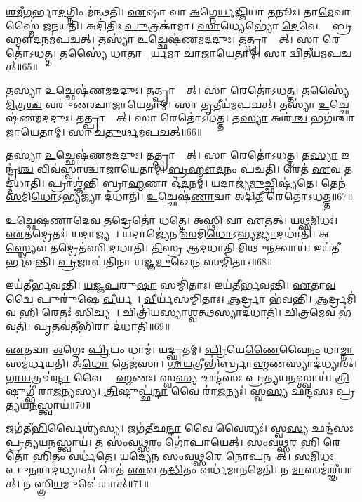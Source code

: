 \ul{𑌶}\ul{𑌮𑍀}\ul{𑌗}𑌰𑍍𑌭𑌾\ul{𑌦}𑌗𑍍𑌨𑌿𑌂 𑌮॑𑌨𑍍𑌥𑌤𑌿।
\ul{𑌏}𑌷𑌾 𑌵𑌾 \ul{𑌅}𑌗𑍍𑌨𑍇\ul{𑌰𑍍𑌯}𑌜𑍍𑌞𑌿𑌯𑌾॑ \ul{𑌤}𑌨𑍂𑌃।
𑌤𑌾\ul{𑌮𑍇}𑌵𑌾𑌸𑍍𑌮𑍈॑ 𑌜𑌨𑌯𑌤𑌿।
𑌅𑌦𑌿॑𑌤𑌿𑌃 \ul{𑌪𑍁}𑌤𑍍𑌰𑌕𑌾॑𑌮𑌾।
\ul{𑌸𑌾}𑌧𑍍𑌯𑍇𑌭𑍍𑌯𑍋॑ \ul{𑌦𑍇}𑌵𑍇𑌭𑍍𑌯𑍋᳚ 𑌬𑍍𑌰𑌹𑍍𑌮𑍗\ul{𑌦}𑌨𑌮॑𑌪𑌚𑌤𑍍।
𑌤𑌸𑍍𑌯𑌾॑ \ul{𑌉}𑌚𑍍𑌛𑍇𑌷॑𑌣𑌮𑌦𑌦𑍁𑌃।
𑌤𑌤𑍍𑌪𑍍𑌰𑌾𑌶𑍍𑌞𑌾᳚𑌤𑍍।
𑌸𑌾 𑌰𑍇𑌤𑍋॑\-𑌽𑌧𑌤𑍍𑌤।
𑌤𑌸𑍍𑌯𑍈॑ \ul{𑌧𑌾}𑌤𑌾 𑌚𑌾᳚\ul{𑌰𑍍𑌯}𑌮𑌾 𑌚𑌾॑𑌜𑌾𑌯𑍇𑌤𑌾𑌮𑍍।
𑌸𑌾 \ul{𑌦𑍍𑌵𑌿}𑌤𑍀𑌯॑𑌮𑌪𑌚𑌤𑍍॥65॥

𑌤𑌸𑍍𑌯𑌾॑ \ul{𑌉}𑌚𑍍𑌛𑍇𑌷॑𑌣𑌮𑌦𑌦𑍁𑌃।
𑌤𑌤𑍍𑌪𑍍𑌰𑌾𑌶𑍍𑌞𑌾᳚𑌤𑍍।
𑌸𑌾 𑌰𑍇𑌤𑍋॑\-𑌽𑌧𑌤𑍍𑌤।
𑌤𑌸𑍍𑌯𑍈॑ \ul{𑌮𑌿}𑌤𑍍𑌰\ul{𑌶𑍍𑌚} 𑌵𑌰𑍁॑𑌣𑌶𑍍𑌚𑌾𑌜𑌾𑌯𑍇𑌤𑌾𑌮𑍍।
𑌸𑌾 \ul{𑌤𑍃}𑌤𑍀𑌯॑𑌮𑌪𑌚𑌤𑍍।
𑌤𑌸𑍍𑌯𑌾॑ \ul{𑌉}𑌚𑍍𑌛𑍇𑌷॑𑌣𑌮𑌦𑌦𑍁𑌃।
𑌤𑌤𑍍𑌪𑍍𑌰𑌾𑌶𑍍𑌞𑌾᳚𑌤𑍍।
𑌸𑌾 𑌰𑍇𑌤𑍋॑\-𑌽𑌧𑌤𑍍𑌤।
𑌤\ul{𑌸𑍍𑌯𑌾} 𑌅𑌶॑\ul{𑌶𑍍𑌚} 𑌭𑌗॑𑌶𑍍𑌚𑌾𑌜𑌾𑌯𑍇𑌤𑌾𑌮𑍍।
𑌸𑌾 𑌚॑\ul{𑌤𑍁}𑌰𑍍𑌥𑌮॑𑌪𑌚𑌤𑍍॥66॥

𑌤𑌸𑍍𑌯𑌾॑ \ul{𑌉}𑌚𑍍𑌛𑍇𑌷॑𑌣𑌮𑌦𑌦𑍁𑌃।
𑌤𑌤𑍍𑌪𑍍𑌰𑌾𑌶𑍍𑌞𑌾᳚𑌤𑍍।
𑌸𑌾 𑌰𑍇𑌤𑍋॑\-𑌽𑌧𑌤𑍍𑌤।
𑌤\ul{𑌸𑍍𑌯𑌾} 𑌇𑌨𑍍𑌦𑍍𑌰॑\ul{𑌶𑍍𑌚} 𑌵𑌿𑌵॑𑌸𑍍𑌵𑌾𑌶𑍍𑌚𑌾𑌜𑌾𑌯𑍇𑌤𑌾𑌮𑍍।
\ul{𑌬𑍍𑌰}\ul{𑌹𑍍𑌮𑍗}\ul{𑌦}𑌨𑌂 𑌪॑𑌚𑌤𑌿।
𑌰𑍇𑌤॑ \ul{𑌏}𑌵 𑌤𑌦𑍍𑌦॑𑌧𑌾𑌤𑌿।
𑌪𑍍𑌰𑌾𑌶𑍍𑌞॑𑌨𑍍𑌤𑌿 𑌬𑍍𑌰𑌾\ul{𑌹𑍍𑌮}𑌣𑌾 𑌓॑\ul{𑌦}𑌨𑌮𑍍।
𑌯𑌦𑌾𑌜𑍍𑌯॑\ul{𑌮𑍁}𑌚𑍍𑌛𑌿𑌷𑍍𑌯॑𑌤𑍇।
𑌤𑍇𑌨॑ \ul{𑌸}𑌮𑌿\ul{𑌧𑍋}\-𑌽𑌭𑍍𑌯𑌜𑍍𑌯𑌾 𑌦॑𑌧𑌾𑌤𑌿।
\ul{𑌉}𑌚𑍍𑌛𑍇𑌷॑\ul{𑌣𑌾}𑌦𑍍𑌵𑌾 𑌅𑌦𑌿॑\ul{𑌤𑍀} 𑌰𑍇𑌤𑍋॑\-𑌽𑌧𑌤𑍍𑌤॥67॥

\ul{𑌉}𑌚𑍍𑌛𑍇𑌷॑𑌣𑌾\ul{𑌦𑍇}𑌵 𑌤𑌦𑍍𑌰𑍇𑌤𑍋॑ 𑌧𑌤𑍍𑌤𑍇।
𑌅\ul{𑌸𑍍𑌥𑌿} 𑌵𑌾 \ul{𑌏}𑌤𑌤𑍍।
𑌯\ul{𑌥𑍍𑌸}𑌮𑌿𑌧𑌃॑।
\ul{𑌏}𑌤𑌦𑍍𑌰𑍇𑌤𑌃॑।
𑌯𑌦𑌾𑌜𑍍𑌯𑌮𑍍᳚।
𑌯𑌦𑌾𑌜𑍍𑌯𑍇॑𑌨 \ul{𑌸}𑌮𑌿\ul{𑌧𑍋}\-𑌽𑌭𑍍𑌯\ul{𑌜𑍍𑌯𑌾}𑌦𑌧𑌾॑𑌤𑌿।
𑌅\ul{𑌸𑍍𑌥𑍍𑌯𑍇}𑌵 𑌤𑌦𑍍𑌰𑍇𑌤॑𑌸𑌿 𑌦𑌧𑌾𑌤𑌿।
\ul{𑌤𑌿}𑌸𑍍𑌰 𑌆𑌦॑𑌧𑌾𑌤𑌿 𑌮𑌿𑌥𑍁\ul{𑌨}𑌤𑍍𑌵𑌾𑌯॑।
𑌇𑌯॑𑌤𑍀𑌰𑍍𑌭𑌵𑌨𑍍𑌤𑌿।
\ul{𑌪𑍍𑌰}𑌜𑌾𑌪॑𑌤𑌿𑌨𑌾 𑌯𑌜𑍍𑌞\ul{𑌮𑍁}𑌖𑍇\ul{𑌨} 𑌸𑌮𑍍𑌮𑌿॑𑌤𑌾𑌃॥68॥

𑌇𑌯॑𑌤𑍀𑌰𑍍𑌭𑌵𑌨𑍍𑌤𑌿।
\ul{𑌯}\ul{𑌜𑍍𑌞}\ul{𑌪}𑌰𑍁\ul{𑌷𑌾} 𑌸𑌮𑍍𑌮𑌿॑𑌤𑌾𑌃।
𑌇𑌯॑𑌤𑍀𑌰𑍍𑌭𑌵𑌨𑍍𑌤𑌿।
\ul{𑌏}𑌤𑌾\ul{𑌵}𑌦𑍍𑌵𑍈 𑌪𑍁𑌰𑍁॑𑌷𑍇 \ul{𑌵𑍀}𑌰𑍍𑌯𑌮𑍍᳚।
\ul{𑌵𑍀}𑌰𑍍𑌯॑𑌸𑌮𑍍𑌮𑌿𑌤𑌾𑌃।
\ul{𑌆}𑌰𑍍𑌦𑍍𑌰𑌾 𑌭॑𑌵𑌨𑍍𑌤𑌿।
\ul{𑌆}𑌰𑍍𑌦𑍍𑌰𑌮𑌿॑\ul{𑌵} 𑌹𑌿 𑌰𑍇𑌤𑌃॑ \ul{𑌸𑌿}𑌚𑍍𑌯𑌤𑍇᳚।
𑌚𑌿𑌤𑍍𑌰𑌿॑𑌯𑌸𑍍𑌯𑌾\ul{𑌶𑍍𑌵}𑌤𑍍𑌥𑌸𑍍𑌯𑌾𑌦॑𑌧𑌾𑌤𑌿।
\ul{𑌚𑌿}𑌤𑍍𑌰\ul{𑌮𑍇}𑌵 𑌭॑𑌵𑌤𑌿।
\ul{𑌘𑍃}𑌤𑌵॑𑌤𑍀\ul{𑌭𑌿}𑌰𑌾 𑌦॑𑌧𑌾𑌤𑌿॥69॥

\ul{𑌏}𑌤𑌦𑍍𑌵𑌾 \ul{𑌅}𑌗𑍍𑌨𑍇𑌃 \ul{𑌪𑍍𑌰𑌿}𑌯𑌂 𑌧𑌾𑌮॑।
𑌯𑌦𑍍\mbox{}\ul{𑌘𑍃}𑌤𑌮𑍍।
\ul{𑌪𑍍𑌰𑌿}𑌯𑍇\ul{𑌣𑍈}𑌵𑍈\ul{𑌨𑌂} 𑌧𑌾\ul{𑌮𑍍𑌨𑌾} 𑌸𑌮॑𑌰𑍍𑌧𑌯𑌤𑌿।
𑌅\ul{𑌥𑍋} 𑌤𑍇𑌜॑𑌸𑌾।
\ul{𑌗𑌾}\ul{𑌯}𑌤𑍍𑌰𑍀𑌭𑌿॑𑌰𑍍𑌬𑍍𑌰𑌾\ul{𑌹𑍍𑌮}𑌣𑌸𑍍𑌯𑌾𑌦॑𑌧𑍍𑌯𑌾𑌤𑍍।
\ul{𑌗𑌾}\ul{𑌯}𑌤𑍍𑌰𑌛॑\ul{𑌨𑍍𑌦𑌾} 𑌵𑍈 𑌬𑍍𑌰𑌾᳚\ul{𑌹𑍍𑌮}𑌣𑌃।
𑌸𑍍𑌵\ul{𑌸𑍍𑌯} 𑌛𑌨𑍍𑌦॑𑌸𑌃 𑌪𑍍𑌰𑌤𑍍𑌯𑌯\ul{𑌨}𑌸𑍍𑌤𑍍𑌵𑌾𑌯॑।
\ul{𑌤𑍍𑌰𑌿}𑌷𑍍𑌟𑍁𑌗𑍍𑌭𑍀॑ 𑌰𑌾\ul{𑌜}𑌨𑍍𑌯॑𑌸𑍍𑌯।
\ul{𑌤𑍍𑌰𑌿}𑌷𑍍𑌟𑍁𑌪𑍍𑌛॑\ul{𑌨𑍍𑌦𑌾} 𑌵𑍈 𑌰𑌾॑\ul{𑌜}𑌨𑍍𑌯𑌃॑।
𑌸𑍍𑌵\ul{𑌸𑍍𑌯} 𑌛𑌨𑍍𑌦॑𑌸𑌃 𑌪𑍍𑌰𑌤𑍍𑌯𑌯\ul{𑌨}𑌸𑍍𑌤𑍍𑌵𑌾𑌯॑॥70॥

𑌜𑌗॑𑌤𑍀\ul{𑌭𑌿}𑌰𑍍𑌵𑍈𑌶𑍍𑌯॑𑌸𑍍𑌯।
𑌜𑌗॑𑌤𑍀𑌛\ul{𑌨𑍍𑌦𑌾} 𑌵𑍈 𑌵𑍈𑌶𑍍𑌯𑌃॑।
𑌸𑍍𑌵\ul{𑌸𑍍𑌯} 𑌛𑌨𑍍𑌦॑𑌸𑌃 𑌪𑍍𑌰𑌤𑍍𑌯𑌯\ul{𑌨}𑌸𑍍𑌤𑍍𑌵𑌾𑌯॑।
𑌤 𑌸𑌂॑𑌵\ul{𑌥𑍍𑌸}𑌰𑌂 𑌗𑍋॑𑌪𑌾𑌯𑍇𑌤𑍍।
\ul{𑌸𑌂}\ul{𑌵}\ul{𑌥𑍍𑌸}𑌰 𑌹𑌿 𑌰𑍇𑌤𑍋॑ \ul{𑌹𑌿}𑌤𑌂 𑌵𑌰𑍍𑌧॑𑌤𑍇।
𑌯𑌦𑍍𑌯𑍇॑𑌨 𑌸𑌂𑌵\ul{𑌥𑍍𑌸}𑌰𑍇 𑌨𑍋\ul{𑌪}𑌨𑌮𑍇᳚𑌤𑍍।
\ul{𑌸}𑌮𑌿\ul{𑌧𑌃} 𑌪𑍁\ul{𑌨}𑌰𑌾𑌦॑𑌧𑍍𑌯𑌾𑌤𑍍।
𑌰𑍇𑌤॑ \ul{𑌏}𑌵 𑌤\ul{𑌦𑍍𑌧𑌿}𑌤𑌂 𑌵𑌰𑍍𑌧॑𑌮𑌾𑌨𑌮𑍇𑌤𑌿।
𑌨 \ul{𑌮𑌾}\ul{}𑌸𑌮॑𑌶𑍍𑌞𑍀𑌯𑌾𑌤𑍍।
𑌨 𑌸𑍍𑌤𑍍𑌰𑌿\ul{𑌯}𑌮𑍁𑌪𑍇॑𑌯𑌾𑌤𑍍॥71॥

